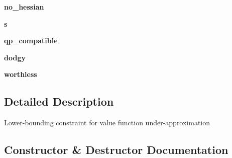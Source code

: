 \begin{DoxyCompactItemize}
{\bfseries no\+\_\+hessian}
\item 
\mbox{\label{classgddp_1_1q__constraint_1_1_q_constraint_a3f8c42c1dd69b3cf5dbb0abf08fd7d69}} 
{\bfseries s}
\item 
\mbox{\label{classgddp_1_1q__constraint_1_1_q_constraint_a19c1d767c921634dfe057f847ae445b6}} 
{\bfseries qp\+\_\+compatible}
\item 
\mbox{\label{classgddp_1_1q__constraint_1_1_q_constraint_a5a276c5af0b70bcf1e178e9513473de1}} 
{\bfseries dodgy}
\item 
\mbox{\label{classgddp_1_1q__constraint_1_1_q_constraint_a5470bf6c5e16ba6afcea527633483715}} 
{\bfseries worthless}
\end{DoxyCompactItemize}


\subsection{Detailed Description}
\begin{DoxyVerb}Lower-bounding constraint for value function under-approximation\end{DoxyVerb}
 

\subsection{Constructor \& Destructor Documentation}
\mbox{\label{classgddp_1_1q__constraint_1_1_q_constraint_a269770d220931d2942ee73e6591cee15}} 
